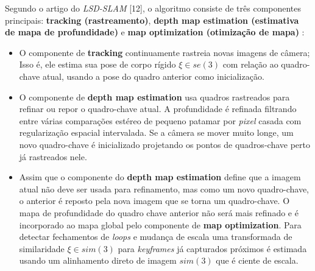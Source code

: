 Segundo o artigo do \textit{LSD-SLAM} [12], o algoritmo consiste de três componentes principais: \textbf{tracking (rastreamento)}, \textbf{depth map estimation (estimativa de mapa de profundidade)} e \textbf{map optimization (otimização de mapa)} :

\begin{itemize}
	\item{O componente de \textbf{tracking} continuamente rastreia novas imagens de câmera; Isso é, ele estima sua pose de corpo rígido $\xi \in se(3)$ com relação ao quadro-chave atual, usando a pose do quadro anterior como inicialização.}
	\item{O componente de \textbf{depth map estimation} usa quadros rastreados para refinar ou repor o quadro-chave atual. A profundidade é refinada filtrando entre várias comparações estéreo de pequeno patamar por \textit{pixel} casada com regularização espacial intervalada. Se a câmera se mover muito longe, um novo quadro-chave é inicializado projetando os pontos de quadros-chave perto já rastreados nele.}
	\item{Assim que o componente do \textbf{depth map estimation} define que a imagem atual não deve ser usada para refinamento, mas como um novo quadro-chave, o anterior é reposto pela nova imagem que se torna um quadro-chave. O mapa de profundidade do quadro chave anterior não será mais refinado e é incorporado ao mapa global pelo componente de \textbf{map optimization}. Para detectar fechamentos de \textit{loops} e mudança de escala uma transformada de similaridade $\xi \in sim(3)$ para \textit{keyframes} já capturados próximos é estimada usando um alinhamento direto de imagem $sim(3)$ que é ciente de escala.}
\end{itemize}